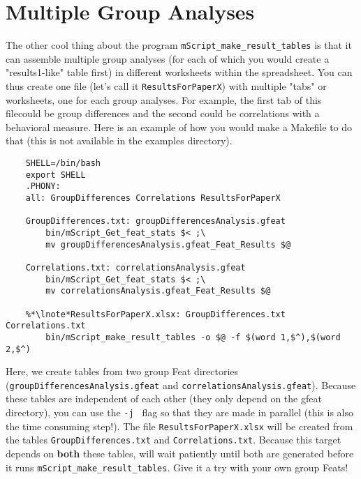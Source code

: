 \section{Multiple Group Analyses} 

The other cool thing about the program \texttt{mScript_make_result_tables} is that it can assemble multiple group analyses (for each of which you would create a "results1-like" table first) in different worksheets within the spreadsheet. You can thus create one file (let's call it \texttt{ResultsForPaperX}) with multiple "tabs" or worksheets, one for each group analyses. For example, the first tab of this filecould be group differences and the second could be correlations with a behavioral measure. Here is an example of how you would make a Makefile to do that (this is not available in the examples directory). 

\begin{lstlisting}
	SHELL=/bin/bash
	export SHELL
	.PHONY: 
	all: GroupDifferences Correlations ResultsForPaperX
  
	GroupDifferences.txt: groupDifferencesAnalysis.gfeat
		bin/mScript_Get_feat_stats $< ;\
		mv groupDifferencesAnalysis.gfeat_Feat_Results $@
	
	Correlations.txt: correlationsAnalysis.gfeat
		bin/mScript_Get_feat_stats $< ;\
		mv correlationsAnalysis.gfeat_Feat_Results $@

	%*\lnote*ResultsForPaperX.xlsx: GroupDifferences.txt Correlations.txt
		bin/mScript_make_result_tables -o $@ -f $(word 1,$^),$(word 2,$^)

\end{lstlisting}

Here, we create tables from two group Feat directories (\texttt{groupDifferencesAnalysis.gfeat} and \texttt{correlationsAnalysis.gfeat}). Because these tables are independent of each other (they only depend on the gfeat directory), you can use the \texttt{-j } flag so that they are made in parallel (this is also the time consuming step!).  The file \texttt{ResultsForPaperX.xlsx} will be created from the tables \texttt{GroupDifferences.txt} and \texttt{Correlations.txt}. Because this target depends on \textbf{both} these tables, \maken{} will wait patiently until both are generated before it runs \texttt{mScript_make_result_tables}. Give it a try with your own group Feats!






